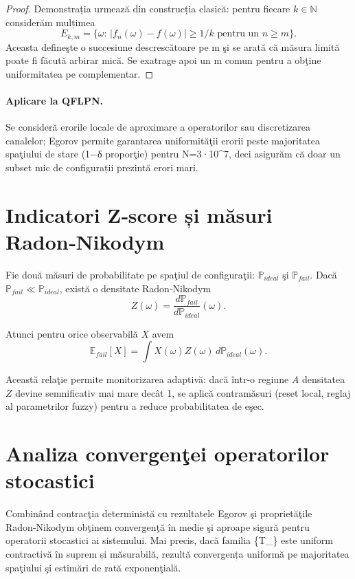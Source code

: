 \documentclass[12pt,a4paper]{report}
\theoremstyle{definition}
\theoremstyle{remark}
\begin{document}
\begin{proof}
Demonstrația urmează din construcția clasică: pentru fiecare $k\in\mathbb{N}$ considerăm mulțimea
\[ E_{k,m} = \{\omega:\, |f_n(\omega)-f(\omega)|\ge 1/k \text{ pentru un } n\ge m\}. \]
Aceasta defineşte o succesiune descrescătoare pe m şi se arată că măsura limită poate fi făcută arbirar mică. Se exatrage apoi un m comun pentru a obţine uniformitatea pe complementar.
\end{proof}

\paragraph{Aplicare la QFLPN.}
Se consideră erorile locale de aproximare a operatorilor sau discretizarea canalelor; Egorov permite garantarea uniformităţii erorii peste majoritatea spaţiului de stare (1−δ proporţie) pentru N=3·10^7, deci asigurăm că doar un subset mic de configurații prezintă erori mari.

\section{Indicatori Z‑score și măsuri Radon‑Nikodym}

Fie două măsuri de probabilitate pe spaţiul de configuraţii: $\mathbb{P}_{ideal}$ şi $\mathbb{P}_{fail}$. Dacă $\mathbb{P}_{fail}\ll\mathbb{P}_{ideal}$, există o densitate Radon‑Nikodym
\begin{equation}
Z(\omega)=\frac{d\mathbb{P}_{fail}}{d\mathbb{P}_{ideal}}(\omega).
\end{equation}

Atunci pentru orice observabilă $X$ avem
\begin{equation}
\mathbb{E}_{fail}[X]=\int X(\omega)Z(\omega)\,d\mathbb{P}_{ideal}(\omega).
\end{equation}

Această relaţie permite monitorizarea adaptivă: dacă într‑o regiune $A$ densitatea $Z$ devine semnificativ mai mare decât 1, se aplică contramăsuri (reset local, reglaj al parametrilor fuzzy) pentru a reduce probabilitatea de eşec.

\section{Analiza convergenţei operatorilor stocastici}

Combinând contracţia deterministă cu rezultatele Egorov şi proprietăţile Radon‑Nikodym obţinem convergenţă în medie şi aproape sigură pentru operatorii stocastici ai sistemului. Mai precis, dacă familia \{T_\omega\} este uniform contractivă în suprem și măsurabilă, rezultă convergența uniformă pe majoritatea spaţiului şi estimări de rată exponenţială.
\end{document}
